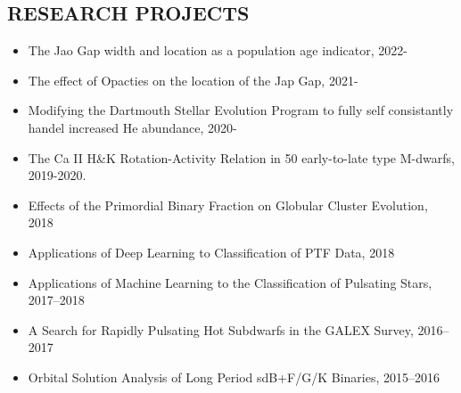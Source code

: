 \documentclass[margin, 10pt]{res} %
\begin{document}
\begin{resume}
\section{RESEARCH PROJECTS}
\begin{itemize}
	\item The Jao Gap width and location as a population age indicator, 2022-
	\item The effect of Opacties on the location of the Jap Gap, 2021-
	\item Modifying the Dartmouth Stellar Evolution Program to fully self consistantly handel increased He abundance, 2020-
	\item The Ca II H\&K Rotation-Activity Relation in 50 early-to-late type M-dwarfs, 2019-2020.
    \item Effects of the Primordial Binary Fraction on Globular Cluster Evolution, 2018
	\item Applications of Deep Learning to Classification of PTF Data, 2018
    \item Applications of Machine Learning to the Classification of Pulsating Stars, 2017--2018
    \item A Search for Rapidly Pulsating Hot Subdwarfs in the GALEX Survey, 2016--2017
    \item Orbital Solution Analysis of Long Period sdB+F/G/K Binaries, 2015--2016
\end{itemize}


\end{resume}
\end{document}
